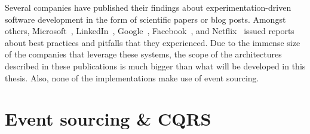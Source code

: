 Several companies have published their findings about experimentation-driven software development in the form of scientific papers or blog posts.
Amongst others, Microsoft~\cite{Kohavi2013}, LinkedIn~\cite{Xu2015}, Google~\cite{Tang2010}, Facebook~\cite{Bakshy2014}, and Netflix~\cite{WEB:Netflix:2016} issued reports about best practices and pitfalls that they experienced.
Due to the immense size of the companies that leverage these systems, the scope of the architectures described in these publications is much bigger than what will be developed in this thesis.
Also, none of the implementations make use of event sourcing.

\section{Event sourcing \& CQRS}
\label{sec:related:event}

\cite{WEB:Fowler:2005}

\cite{WEB:Fowler:2011}